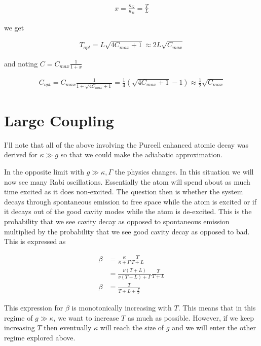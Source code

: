 \documentclass[12pt]{article}
\begin{document}
\begin{align}
x = \frac{\kappa_G}{\kappa_B} = \frac{T}{L}
\end{align}

we get

\begin{align}
T_{opt} = L \sqrt{4C_{max}+1} \approx 2L \sqrt{C_{max}}
\end{align}

and noting $C = C_{max} \frac{1}{1+x}$

\begin{align}
C_{opt} = C_{max} \frac{1}{1+ \sqrt{4C_{max}+1}} = \frac{1}{4}\left(\sqrt{4C_{max} +1} -1 \right)\approx \frac{1}{2}\sqrt{C_{max}}
\end{align}



\section{Large Coupling}

I'll note that all of the above involving the Purcell enhanced atomic decay was derived for $\kappa \gg g$ so that we could make the adiabatic approximation.

In the opposite limit with $g \gg \kappa, \Gamma$ the physics changes. In this situation we will now see many Rabi oscillations. Essentially the atom will spend about as much time excited as it does non-excited. The question then is whether the system decays through spontaneous emission to free space while the atom is excited or if it decays out of the good cavity modes while the atom is de-excited. This is the probability that we see cavity decay as opposed to spontaneous emission multiplied by the probability that we see good cavity decay as opposed to bad. This is expressed as

\begin{align}
\beta &= \frac{\kappa}{\kappa+\Gamma} \frac{T}{T+L}\\
&= \frac{\nu (T+L)}{\nu(T+L) + \Gamma} \frac{T}{T+L}\\
\beta &= \frac{T}{T+L+\frac{\Gamma}{\nu}}
\end{align}

This expression for $\beta$ is monotonically increasing with $T$. This means that in this regime of $g \gg \kappa$, we want to increase $T$ as much as possible. However, if we keep increasing $T$ then eventually $\kappa$ will reach the size of $g$ and we will enter the other regime explored above.
\end{document}
